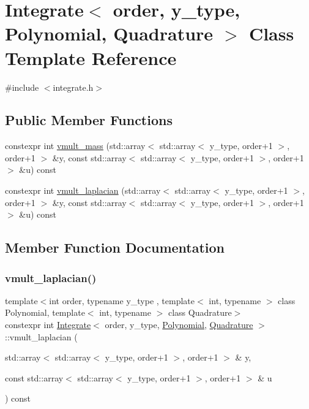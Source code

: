 \hypertarget{class_integrate}{}\section{Integrate$<$ order, y\+\_\+type, Polynomial, Quadrature $>$ Class Template Reference}
\label{class_integrate}


{\ttfamily \#include $<$integrate.\+h$>$}

\subsection*{Public Member Functions}
\begin{DoxyCompactItemize}
\item 
constexpr int \hyperlink{class_integrate_ac76c916feda54370585d288f80802f05}{vmult\+\_\+mass} (std\+::array$<$ std\+::array$<$ y\+\_\+type, order+1 $>$, order+1 $>$ \&y, const std\+::array$<$ std\+::array$<$ y\+\_\+type, order+1 $>$, order+1 $>$ \&u) const
\item 
constexpr int \hyperlink{class_integrate_ae828197f1ebebe1332217481d98c8462}{vmult\+\_\+laplacian} (std\+::array$<$ std\+::array$<$ y\+\_\+type, order+1 $>$, order+1 $>$ \&y, const std\+::array$<$ std\+::array$<$ y\+\_\+type, order+1 $>$, order+1 $>$ \&u) const
\end{DoxyCompactItemize}


\subsection{Member Function Documentation}
\mbox{\label{class_integrate_ae828197f1ebebe1332217481d98c8462}} 
\subsubsection{\texorpdfstring{vmult\+\_\+laplacian()}{vmult\_laplacian()}}
{\footnotesize\ttfamily template$<$int order, typename y\+\_\+type , template$<$ int, typename $>$ class Polynomial, template$<$ int, typename $>$ class Quadrature$>$ \\
constexpr int \hyperlink{class_integrate}{Integrate}$<$ order, y\+\_\+type, \hyperlink{class_polynomial}{Polynomial}, \hyperlink{class_quadrature}{Quadrature} $>$\+::vmult\+\_\+laplacian (\begin{DoxyParamCaption}\item[{std\+::array$<$ std\+::array$<$ y\+\_\+type, order+1 $>$, order+1 $>$ \&}]{y,  }\item[{const std\+::array$<$ std\+::array$<$ y\+\_\+type, order+1 $>$, order+1 $>$ \&}]{u }\end{DoxyParamCaption}) const\hspace{0.3cm}{\ttfamily [inline]}}

